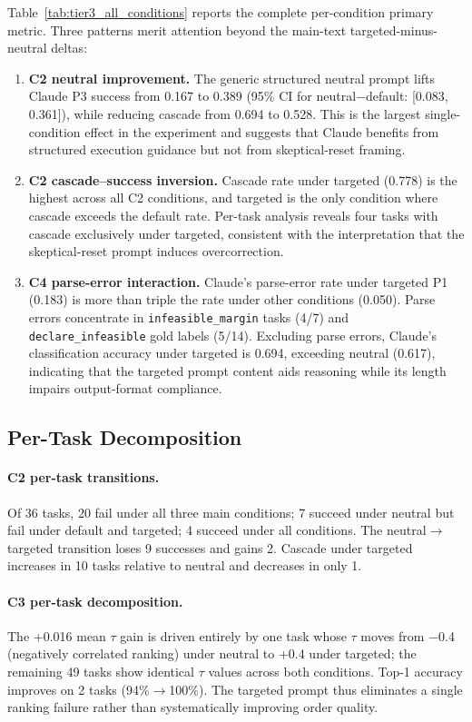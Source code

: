 Table~\ref{tab:tier3_all_conditions} reports the complete per-condition primary metric. Three patterns merit attention beyond the main-text targeted-minus-neutral deltas:

\begin{enumerate}[leftmargin=5mm,itemsep=1mm,topsep=1mm]
    \item \textbf{C2 neutral improvement.} The generic structured neutral prompt lifts Claude P3 success from 0.167 to 0.389 (95\% CI for neutral$-$default: [0.083, 0.361]), while reducing cascade from 0.694 to 0.528. This is the largest single-condition effect in the experiment and suggests that Claude benefits from structured execution guidance but not from skeptical-reset framing.
    \item \textbf{C2 cascade--success inversion.} Cascade rate under targeted (0.778) is the highest across all C2 conditions, and targeted is the only condition where cascade exceeds the default rate. Per-task analysis reveals four tasks with cascade exclusively under targeted, consistent with the interpretation that the skeptical-reset prompt induces overcorrection.
    \item \textbf{C4 parse-error interaction.} Claude's parse-error rate under targeted P1 (0.183) is more than triple the rate under other conditions (0.050). Parse errors concentrate in \texttt{infeasible\_margin} tasks (4/7) and \texttt{declare\_infeasible} gold labels (5/14). Excluding parse errors, Claude's classification accuracy under targeted is 0.694, exceeding neutral (0.617), indicating that the targeted prompt content aids reasoning while its length impairs output-format compliance.
\end{enumerate}

\subsection{Per-Task Decomposition}

\paragraph{C2 per-task transitions.} Of 36 tasks, 20 fail under all three main conditions; 7 succeed under neutral but fail under default and targeted; 4 succeed under all conditions. The neutral$\to$targeted transition loses 9 successes and gains 2. Cascade under targeted increases in 10 tasks relative to neutral and decreases in only 1.

\paragraph{C3 per-task decomposition.} The +0.016 mean $\tau$ gain is driven entirely by one task whose $\tau$ moves from $-$0.4 (negatively correlated ranking) under neutral to +0.4 under targeted; the remaining 49 tasks show identical $\tau$ values across both conditions. Top-1 accuracy improves on 2 tasks (94\%$\to$100\%). The targeted prompt thus eliminates a single ranking failure rather than systematically improving order quality.

